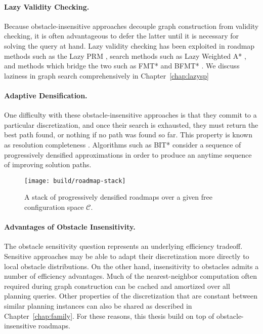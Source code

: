 \paragraph{Lazy Validity Checking.}
Because obstacle-insensitive approaches decouple graph construction
from validity checking,
it is often advantageous to defer the latter until it is
necessary for solving the query at hand.
Lazy validity checking has been exploited
in roadmap methods such as the Lazy PRM
\citep{bohlin2000lazyprm, hauser2015lazy},
search methods such as Lazy Weighted A* \citep{cohen2014narms},
and methods which bridge the two such as FMT* \citep{janson2015fmtstar}
and BFMT* \citep{starek2015bfmtstar}.
We discuss laziness in graph search comprehensively
in Chapter~\ref{chap:lazysp}

\paragraph{Adaptive Densification.}
One difficulty with these obstacle-insensitive approaches
is that they commit to a particular discretization,
and once their search is exhausted,
they must return the best path found,
or nothing if no path was found so far.
This property is known as resolution completeness
\citep{cheng2004rescomplete}.
Algorithms such as BIT* \citep{gammell2015bitstar}
consider a sequence of progressively densified approximations
in order to produce an anytime sequence of improving solution paths.


\begin{figure}
   \centering
   \texttt{[image: build/roadmap-stack]}
   \caption{A stack of progressively densified roadmaps
      over a given free configuration space $\mathcal{C}$.}
\end{figure}

\paragraph{Advantages of Obstacle Insensitivity.}
The obstacle sensitivity question represents an underlying efficiency
tradeoff.
Sensitive approaches may be able to adapt their discretization more
directly to local obstacle distributions.
On the other hand,
insensitivity to obstacles admits a number of efficiency advantages.
Much of the nearest-neighbor computation
often required during graph construction can be cached and amortized
over all planning queries.
Other properties of the discretization that are constant between
similar planning instances can also be shared
as described in Chapter~\ref{chap:family}.
For these reasons,
this thesis build on top of obstacle-insensitive roadmaps.

